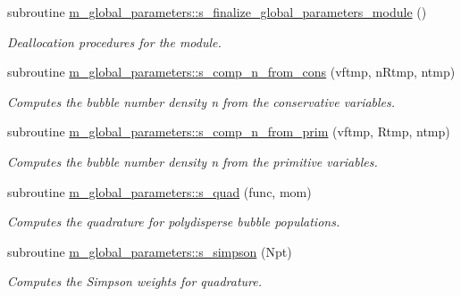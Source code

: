 \begin{DoxyCompactItemize}
subroutine \hyperlink{namespacem__global__parameters_aa2237c2ed3662bbd69ef39e2e92af7bf}{m\+\_\+global\+\_\+parameters\+::s\+\_\+finalize\+\_\+global\+\_\+parameters\+\_\+module} ()
\begin{DoxyCompactList}\small\item\em Deallocation procedures for the module. \end{DoxyCompactList}\item 
subroutine \hyperlink{namespacem__global__parameters_aac1a5a73b1eae759c913983b38047167}{m\+\_\+global\+\_\+parameters\+::s\+\_\+comp\+\_\+n\+\_\+from\+\_\+cons} (vftmp, n\+Rtmp, ntmp)
\begin{DoxyCompactList}\small\item\em Computes the bubble number density n from the conservative variables. \end{DoxyCompactList}\item 
subroutine \hyperlink{namespacem__global__parameters_acdaa3827df6fee38a3e55e8b13130c27}{m\+\_\+global\+\_\+parameters\+::s\+\_\+comp\+\_\+n\+\_\+from\+\_\+prim} (vftmp, Rtmp, ntmp)
\begin{DoxyCompactList}\small\item\em Computes the bubble number density n from the primitive variables. \end{DoxyCompactList}\item 
subroutine \hyperlink{namespacem__global__parameters_aa5a48fa9cc196136634022cfa6708213}{m\+\_\+global\+\_\+parameters\+::s\+\_\+quad} (func, mom)
\begin{DoxyCompactList}\small\item\em Computes the quadrature for polydisperse bubble populations. \end{DoxyCompactList}\item 
subroutine \hyperlink{namespacem__global__parameters_a78f4bf8bb59af4396bf11aca330463ec}{m\+\_\+global\+\_\+parameters\+::s\+\_\+simpson} (Npt)
\begin{DoxyCompactList}\small\item\em Computes the Simpson weights for quadrature. \end{DoxyCompactList}\end{DoxyCompactItemize}
